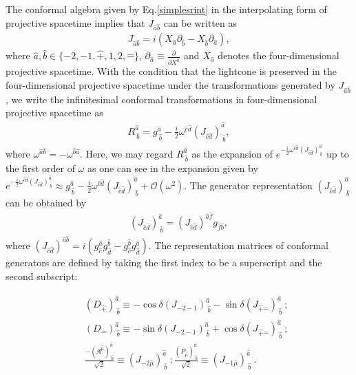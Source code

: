 \documentclass[journal,article,submit,pdftex,moreauthors]{Definitions/mdpi}
\begin{document}
 The conformal algebra given by Eq.\eqref{simplesrint} in the interpolating form of projective spacetime implies that $J_{\hat{a}\hat{b}}$ can be written as
\begin{align}
    J_{\hat{a}\hat{b}}=i(X_{\hat{a}}\partial_{\hat{b}}-X_{\hat{b}}\partial_{\hat{a}}),
\end{align}
where $\hat{a},\hat{b}\in\{-2,-1,\hat{+},1,2,\hat{-}\}$, $\partial_{\hat{a}}\equiv\frac{\partial}{\partial X^{\hat{a}}}$ and $X_{\hat{a}}$ denotes the four-dimensional projective spacetime. With the condition that the lightcone is preserved in the four-dimensional projective spacetime under the transformations generated by $ J_{\hat{a}\hat{b}}$, we write the infinitesimal conformal transformations in four-dimensional projective spacetime as
\begin{align}
R^{\hat{a}}_{~\hat{b}}=g^{\hat{a}}_{~\hat{b}}-\frac{i}{2}\omega^{\hat{c}\hat{d}}(J_{\hat{c}\hat{d}})^{\hat{a}}_{~\hat{b}},\label{R_conformalTransformations}
\end{align}
where $\omega^{\hat{a}\hat{b}}=-\omega^{\hat{b}\hat{a}}$. Here, we may regard $R^{\hat{a}}_{~\hat{b}}$ as the expansion of $e^{-\frac{i}{2}\omega^{\hat{c}\hat{d}}(J_{\hat{c}\hat{d}})^{\hat{a}}_{~\hat{b}}}$ up to the first order of $\omega$ as one can see in the expansion given by 
$e^{-\frac{i}{2}\omega^{\hat{c}\hat{d}}(J_{\hat{c}\hat{d}})^{\hat{a}}_{~\hat{b}}} \approx  g^{\hat{a}}_{~\hat{b}}-\frac{i}{2}\omega^{\hat{c}\hat{d}}(J_{\hat{c}\hat{d}})^{\hat{a}}_{~\hat{b}}+\mathcal{O}(\omega^2)$.
The generator representation $(J_{\hat{c}\hat{d}})^{\hat{a}}_{~\hat{b}}$ can be obtained by
\begin{align}
    (J_{\hat{c}\hat{d}})^{\hat{a}}_{~\hat{b}}=(J_{\hat{c}\hat{d}})^{\hat{a}\hat{f}}g_{\hat{f}\hat{b}},
\end{align}
where $(J_{{\hat{c}}{\hat{d}}})^{{\hat{a}}{\hat{b}}}=i(g_{\hat{c}}^{\hat{a}} g_{\hat{d}}^{\hat{b}}-g_{\hat{c}}^{\hat{b}} g_{\hat{d}}^{\hat{a}})$. The representation matrices of conformal generators are defined by taking the first  index to be a superscript and the second subscript:

\begin{eqnarray}
    &&(D_{\hat{+}})^{\hat{a}}_{~\hat{b}}\equiv -\cos{\delta}(J_{-2-1})^{\hat{a}}_{~\hat{b}}-\sin{\delta}(J_{\hat{+}\hat{-}})^{\hat{a}}_{~\hat{b}}~;\nonumber\\
    &&(D_{\hat{-}})^{\hat{a}}_{~\hat{b}}\equiv -\sin{\delta}(J_{-2-1})^{\hat{a}}_{~\hat{b}}+\cos{\delta}(J_{\hat{+}\hat{-}})^{\hat{a}}_{~\hat{b}}~;\nonumber\\
    &&\frac{-(\mathfrak{K}^{\hat{\mu}})^{\hat{a}}_{~\hat{b}}}{\sqrt{2}}\equiv (J_{-2\hat{\mu}})^{\hat{a}}_{~\hat{b}}~;
    \frac{(P_{\hat{\mu}})^{\hat{a}}_{~\hat{b}}}{\sqrt{2}}\equiv (J_{-1\hat{\mu}})^{\hat{a}}_{~\hat{b}}~.
    \label{implicit6x6}
\end{eqnarray}
\end{document}
